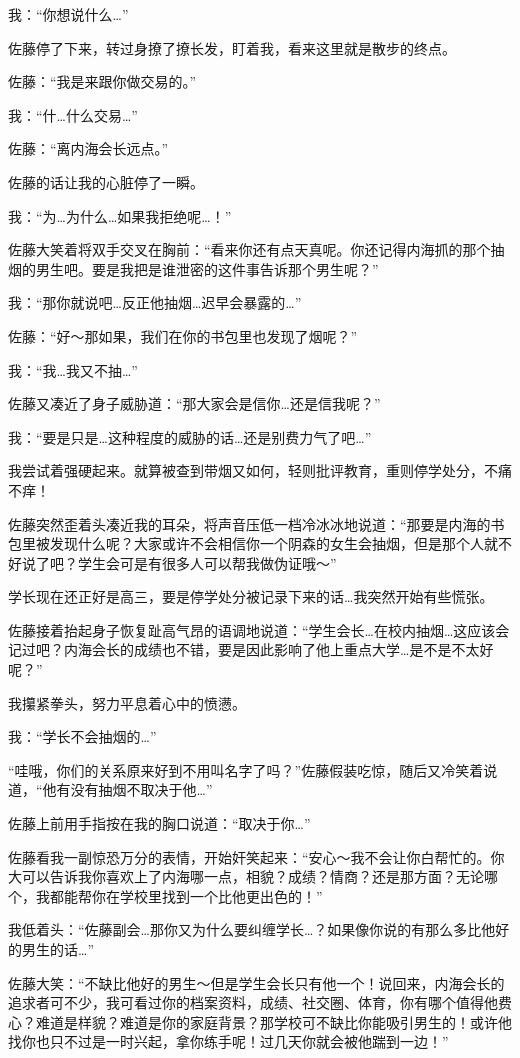 我：“你想说什么…”

佐藤停了下来，转过身撩了撩长发，盯着我，看来这里就是散步的终点。

佐藤：“我是来跟你做交易的。”

我：“什…什么交易…”

佐藤：“离内海会长远点。”

佐藤的话让我的心脏停了一瞬。

我：“为…为什么…如果我拒绝呢…！”

佐藤大笑着将双手交叉在胸前：“看来你还有点天真呢。你还记得内海抓的那个抽烟的男生吧。要是我把是谁泄密的这件事告诉那个男生呢？”

我：“那你就说吧…反正他抽烟…迟早会暴露的…”

佐藤：“好～那如果，我们在你的书包里也发现了烟呢？”

我：“我…我又不抽…”

佐藤又凑近了身子威胁道：“那大家会是信你…还是信我呢？”

我：“要是只是…这种程度的威胁的话…还是别费力气了吧…”

我尝试着强硬起来。就算被查到带烟又如何，轻则批评教育，重则停学处分，不痛不痒！

佐藤突然歪着头凑近我的耳朵，将声音压低一档冷冰冰地说道：“那要是内海的书包里被发现什么呢？大家或许不会相信你一个阴森的女生会抽烟，但是那个人就不好说了吧？学生会可是有很多人可以帮我做伪证哦～”

学长现在还正好是高三，要是停学处分被记录下来的话…我突然开始有些慌张。

佐藤接着抬起身子恢复趾高气昂的语调地说道：“学生会长…在校内抽烟…这应该会记过吧？内海会长的成绩也不错，要是因此影响了他上重点大学…是不是不太好呢？”

我攥紧拳头，努力平息着心中的愤懑。

我：“学长不会抽烟的…”

“哇哦，你们的关系原来好到不用叫名字了吗？”佐藤假装吃惊，随后又冷笑着说道，“他有没有抽烟不取决于他…”

佐藤上前用手指按在我的胸口说道：“取决于你…”

佐藤看我一副惊恐万分的表情，开始奸笑起来：“安心～我不会让你白帮忙的。你大可以告诉我你喜欢上了内海哪一点，相貌？成绩？情商？还是那方面？无论哪个，我都能帮你在学校里找到一个比他更出色的！”

我低着头：“佐藤副会…那你又为什么要纠缠学长…？如果像你说的有那么多比他好的男生的话…”

佐藤大笑：“不缺比他好的男生～但是学生会长只有他一个！说回来，内海会长的追求者可不少，我可看过你的档案资料，成绩、社交圈、体育，你有哪个值得他费心？难道是样貌？难道是你的家庭背景？那学校可不缺比你能吸引男生的！或许他找你也只不过是一时兴起，拿你练手呢！过几天你就会被他踹到一边！”

